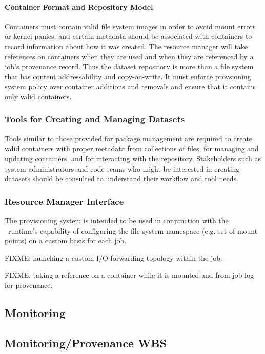 \paragraph{Container Format and Repository Model}
Containers must contain valid file system images in order to avoid
mount errors or kernel panics, and certain metadata should be associated
with containers to record information about how it was created.
The resource manager will take references on containers when they are used
and when they are referenced by a job's provenance record.
Thus the dataset repository is more than a file system that has
content addressability and copy-on-write.
It must enforce provsioning system policy over container additions and
removals and ensure that it contains only valid containers.

\subsubsection{Tools for Creating and Managing Datasets}

Tools similar to those provided for package management are required to
create valid containers with proper metadata from collections of files,
for managing and updating containers, and for interacting with the repository.
Stakeholders such as system administrators and code teams who might
be interested in creating datasets should be consulted to understand
their workflow and tool needs.  

\subsubsection{Resource Manager Interface}

The provisioning system is intended to be used in conjunction with
the \ngrm\ runtime's capability of configuring the file system
namespace (e.g. set of mount points) on a custom basis for each job. 

FIXME: launching a custom I/O forwarding topology within the job.

FIXME: taking a reference on a container while it is mounted and
from job log for provenance.

\subsection{Monitoring}

\newpage
\subsection{Monitoring/Provenance WBS}

